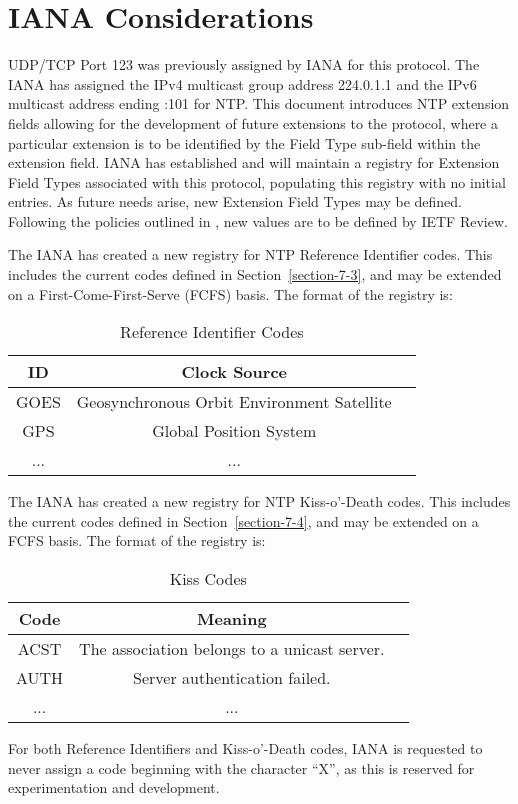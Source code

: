 \chapter{IANA Considerations}
\label{section-16}

UDP/TCP Port 123 was previously assigned by IANA for this protocol.
The IANA has assigned the IPv4 multicast group address 224.0.1.1 and
the IPv6 multicast address ending :101 for NTP.  This document
introduces NTP extension fields allowing for the development of
future extensions to the protocol, where a particular extension is to
be identified by the Field Type sub-field within the extension field.
IANA has established and will maintain a registry for Extension Field
Types associated with this protocol, populating this registry with no
initial entries.  As future needs arise, new Extension Field Types
may be defined.  Following the policies outlined in \cite{RFC5226}, new
values are to be defined by IETF Review.

The IANA has created a new registry for NTP Reference Identifier
codes.  This includes the current codes defined in Section~\ref{section-7-3}, and
may be extended on a First-Come-First-Serve (FCFS) basis.  The format
of the registry is:

\begin{table}[htb]
\center
\begin{tabular}{c | c | c}
ID   & Clock Source \\
\hline
\hline
GOES & Geosynchronous Orbit Environment Satellite \\
GPS  & Global Position System                     \\
...  & ...                                        \\
\hline
\end{tabular}
\label{reference_identifier_codes}
\caption{Reference Identifier Codes}
\end{table}

The IANA has created a new registry for NTP Kiss-o'-Death codes.
This includes the current codes defined in Section~\ref{section-7-4}, and may be
extended on a FCFS basis.  The format of the registry is:

\begin{table}[htb]
\center
\begin{tabular}{c | c | c}
Code & Meaning \\
\hline
\hline
ACST & The association belongs to a unicast server. \\
AUTH & Server authentication failed. \\
...  & ... \\
\hline
\end{tabular}
\label{kiss_codes}
\caption{Kiss Codes}
\end{table}

For both Reference Identifiers and Kiss-o'-Death codes, IANA is
requested to never assign a code beginning with the character ``X'', as
this is reserved for experimentation and development.
